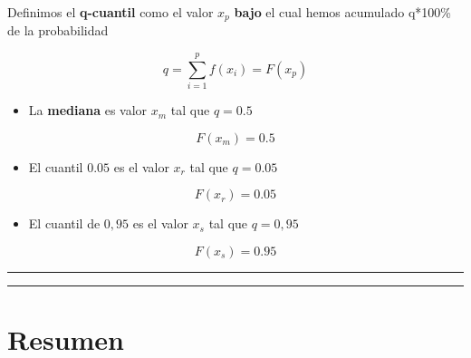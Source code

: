 \documentclass[
]{book}
\providecommand{\tightlist}{%
  \setlength{\itemsep}{0pt}\setlength{\parskip}{0pt}}
\begin{document}
Definimos el \textbf{q-cuantil} como el valor \(x_{p}\) \textbf{bajo} el cual hemos acumulado q*100\% de la probabilidad

\[q=\sum_{i=1}^p f(x_i) = F (x_p)\]

\begin{itemize}
\tightlist
\item
  La \textbf{mediana} es valor \(x_m\) tal que \(q=0.5\)
\end{itemize}

\[F(x_{m})=0.5\]

\begin{itemize}
\tightlist
\item
  El cuantil \(0.05\) es el valor \(x_{r}\) tal que \(q=0.05\)
\end{itemize}

\[F(x_{r})=0.05\]

\begin{itemize}
\tightlist
\item
  El cuantil de \(0,95\) es el valor \(x_{s}\) tal que \(q=0,95\)
\end{itemize}

\[F(x_{s})=0.95\]

\begin{center}\rule{0.5\linewidth}{0.5pt}\end{center}

\begin{center}\rule{0.5\linewidth}{0.5pt}\end{center}

\hypertarget{resumen}{%
\section{Resumen}\label{resumen}}
\end{document}
